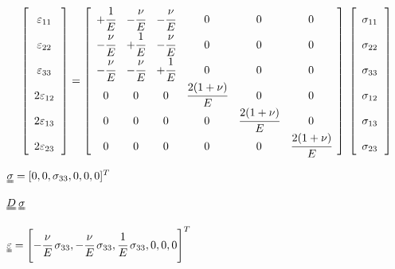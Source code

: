 \documentclass[onecolumn,11pt]{report}
\def\lthtmlcheckvsize{\ifdim\ht\sizebox<\vsize 
  \ifdim\wd\sizebox<\hsize\expandafter\hfill\fi \expandafter\vfill
  \else\expandafter\vss\fi}%
\begin{document}
{\newpage\clearpage
{}%
\begin{displaymath}%
	\left[
\begin{array} {c}
\varepsilon_{11} \cfrac{}{}\\
\varepsilon_{22} \cfrac{}{}\\
\varepsilon_{33} \cfrac{}{}\\
2 \varepsilon_{12} \cfrac{}{}\\
2 \varepsilon_{13} \cfrac{}{}\\
2 \varepsilon_{23} \cfrac{}{}
\end{array}
\right] =
\left[
\begin{array}{cccccc}
+\cfrac{1}{E} & -\cfrac{\nu}{E} & -\cfrac{\nu}{E} & 0 & 0 & 0\\
-\cfrac{\nu}{E} & +\cfrac{1}{E} & -\cfrac{\nu}{E} & 0 & 0 & 0\\
-\cfrac{\nu}{E} & -\cfrac{\nu}{E} & +\cfrac{1}{E} & 0 & 0 & 0\\
0 & 0 & 0 & \cfrac{2(1+\nu)}{E} & 0 & 0 \\
0 & 0 & 0 & 0 & \cfrac{2(1+\nu)}{E} & 0 \\
0 & 0 & 0 & 0 & 0 & \cfrac{2(1+\nu)}{E}
\end{array}
\right] \:
\left[
\begin{array} {c}
\sigma_{11} \cfrac{}{}\\
\sigma_{22} \cfrac{}{}\\
\sigma_{33} \cfrac{}{}\\
\sigma_{12} \cfrac{}{}\\
\sigma_{13} \cfrac{}{}\\
\sigma_{23} \cfrac{}{}
\end{array}
\right]\end{displaymath}%
\lthtmldisplayZ
\lthtmlcheckvsize\clearpage}

{\newpage\clearpage
{}%
$ \uuline{\sigma} = [0,0,\sigma_{33},0,0,0]^T$%
\lthtmlindisplaymathZ
\lthtmlcheckvsize\clearpage}

{\newpage\clearpage
{}%
$ \uuline{D} \: \uuline{\sigma}$%
\lthtmlindisplaymathZ
\lthtmlcheckvsize\clearpage}

{\newpage\clearpage
{}%
$\displaystyle \uuline{\varepsilon} = \left [ -\cfrac{\nu}{E} \: \sigma_{33},-\cfrac{\nu}{E} \: \sigma_{33},\cfrac{1}{E} \: \sigma_{33},0,0,0 \right]^T $%
\lthtmlindisplaymathZ
\lthtmlcheckvsize\clearpage}
\end{document}
